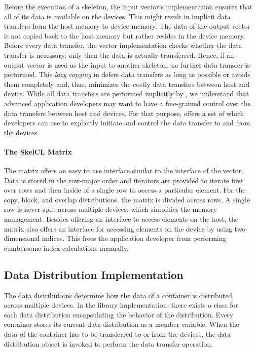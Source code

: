 Before the execution of a skeleton, the input vector's implementation ensures that all of its data is available on the devices.
This might result in implicit data transfers from the host memory to device memory.
The data of the output vector is not copied back to the host memory but rather resides in the device memory.
Before every data transfer, the vector implementation checks whether the data transfer is necessary;
only then the data is actually transferred.
Hence, if an output vector is used as the input to another skeleton, no further data transfer is performed.
This \emph{lazy copying} in \SkelCL defers data transfers as long as possible or avoids them completely and, thus, minimizes the costly data transfers between host and device.
While all data transfers are performed implicitly by \SkelCL, we understand that advanced application developers may want to have a fine-grained control over the data transfers between host and devices.
For that purpose, \SkelCL offers a set of \APIs which developers can use to explicitly initiate and control the data transfer to and from the devices.



\paragraph{The SkelCL Matrix}
The \SkelCL matrix offers an easy to use interface similar to the interface of the vector.
Data is stored in the row-major order and iterators are provided to iterate first over rows and then inside of a single row to access a particular element.
For the copy, block, and overlap distributions, the matrix is divided across rows.
A single row is never split across multiple devices, which simplifies the memory management.
Besides offering an interface to access elements on the host, the matrix also offers an interface for accessing elements on the device by using two-dimensional indices.
This frees the application developer from performing cumbersome index calculations manually.










\subsection{Data Distribution Implementation}
\label{section:skelcl-library:distribution}
The data distributions determine how the data of a container is distributed across multiple devices.
In the \SkelCL library implementation, there exists a class for each data distribution encapsulating the behavior of the distribution.
Every container stores its current data distribution as a member variable.
When the data of the container has to be transferred to or from the devices, the data distribution object is invoked to perform the data transfer operation.

